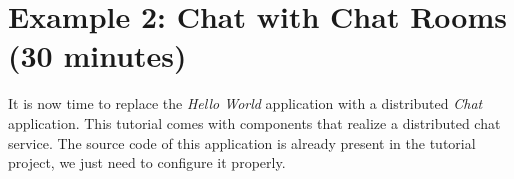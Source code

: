 %
% 
%
%
%
%

\section{Example 2: Chat with Chat Rooms (30 minutes)}
\label{sec:example_chat}

It is now time to replace the \emph{Hello World} application with a distributed \emph{Chat} application.
This tutorial comes with components that realize a distributed chat service.
The source code of this application is already present in the tutorial project,
we just need to configure it properly.

